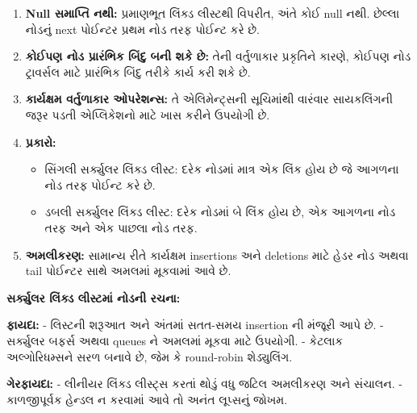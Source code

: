 \begin{enumerate}
\def\labelenumi{\arabic{enumi}.}
\item
  \textbf{Null સમાપ્તિ નથી:} પ્રમાણભૂત લિંક્ડ લીસ્ટથી વિપરીત, અંતે કોઈ null નથી.
  છેલ્લા નોડનું next પોઈન્ટર પ્રથમ નોડ તરફ પોઈન્ટ કરે છે.
\item
  \textbf{કોઈપણ નોડ પ્રારંભિક બિંદુ બની શકે છે:} તેની વર્તુળાકાર પ્રકૃતિને કારણે,
  કોઈપણ નોડ ટ્રાવર્સલ માટે પ્રારંભિક બિંદુ તરીકે કાર્ય કરી શકે છે.
\item
  \textbf{કાર્યક્ષમ વર્તુળાકાર ઓપરેશન્સ:} તે એલિમેન્ટ્સની સૂચિમાંથી વારંવાર સાયકલિંગની
  જરૂર પડતી એપ્લિકેશનો માટે ખાસ કરીને ઉપયોગી છે.
\item
  \textbf{પ્રકારો:}

  \begin{itemize}
  \tightlist
  \item
    સિંગલી સર્ક્યુલર લિંક્ડ લીસ્ટ: દરેક નોડમાં માત્ર એક લિંક હોય છે જે આગળના નોડ તરફ
    પોઈન્ટ કરે છે.
  \item
    ડબલી સર્ક્યુલર લિંક્ડ લીસ્ટ: દરેક નોડમાં બે લિંક હોય છે, એક આગળના નોડ તરફ અને એક
    પાછલા નોડ તરફ.
  \end{itemize}
\item
  \textbf{અમલીકરણ:} સામાન્ય રીતે કાર્યક્ષમ insertions અને deletions માટે હેડર
  નોડ અથવા tail પોઈન્ટર સાથે અમલમાં મૂકવામાં આવે છે.
\end{enumerate}

\textbf{સર્ક્યુલર લિંક્ડ લીસ્ટમાં નોડની રચના:}

\begin{Shaded}
\begin{Highlighting}[]
     \NormalTok{(}
        \OperatorTok{=}
         \OperatorTok{=}   
\end{Highlighting}
\end{Shaded}

\textbf{ફાયદા:} - લિસ્ટની શરૂઆત અને અંતમાં સતત-સમય insertion ની મંજૂરી આપે છે. -
સર્ક્યુલર બફર્સ અથવા queues ને અમલમાં મૂકવા માટે ઉપયોગી. - કેટલાક અલ્ગોરિધમ્સને સરળ
બનાવે છે, જેમ કે round-robin શેડ્યુલિંગ.

\textbf{ગેરફાયદા:} - લીનીયર લિંક્ડ લીસ્ટ્સ કરતાં થોડું વધુ જટિલ અમલીકરણ અને સંચાલન.
- કાળજીપૂર્વક હેન્ડલ ન કરવામાં આવે તો અનંત લૂપ્સનું જોખમ.

